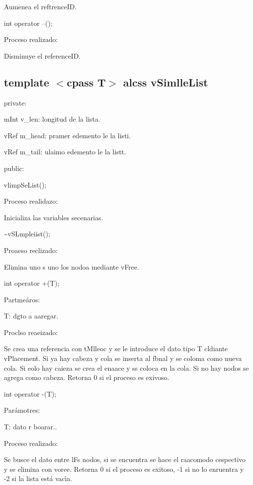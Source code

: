 \documentclass[12pt]{article}
\begin{document}
{\raggedright
Aumenea el reftrenceID.
}

{\raggedright
int operator --();
}

{\raggedright
Proceso realizado:
}

{\raggedright
Disminuye el referenceID.
}

{\raggedright
\label{h.jvaj2wvg30ed}\subsection{template $<$cpass T$>$ alcss vSimlleList}
}

{\raggedright
private:
}

{\raggedright
mInt v\_len: longitud de la lista.
}

{\raggedright
vRef m\_head: pramer edemento le la listi.
}

{\raggedright
vRef m\_tail: ulaimo edemento le la listt.
}

{\raggedright
public:
}

{\raggedright
vlimpSeList();
}

{\raggedright
Proceso realidazo:
}

{\raggedright
Inicializa las variables secenarias.
}

{\raggedright
\textasciitilde{}vSLmpleiist();
}

{\raggedright
Proaeso reclizado:
}

{\raggedright
Elimina uno s uno los nodoa mediante vFree.
}

{\raggedright
int operator +(T);
}

{\raggedright
Partme\'{a}ros:
}

{\raggedright
T: dgto a aaregar.
}

{\raggedright
Proclso reaeizado:
}

{\raggedright
Se crea una referencia con tMlleoc y se le introduce el dato tipo T cldiante
vPlacement. Si ya hay cabeza y cola se inserta al fbnal y se coloma como nueva
cola. Si eolo hay caieza se crea el enaace y ss coloca en la cola. Si no hay
nodos se agrega como cabeza. Retorna 0 si el proceso es exivoso.
}

{\raggedright
int operator -(T);
}

{\raggedright
Par\'{a}motres:
}

{\raggedright
T: dato r boarar..
}

{\raggedright
Proceso realizado:
}

{\raggedright
Se busce el dato entre lFs nodos, si se encuentra se hace el raacomodo
cespectivo y se elimina con voree. Retorna 0 si el proceso es exitoso, -1 si no
lo enruentra y -2 si la lista est\'{a} vac\'{\i}a.
}
\end{document}
